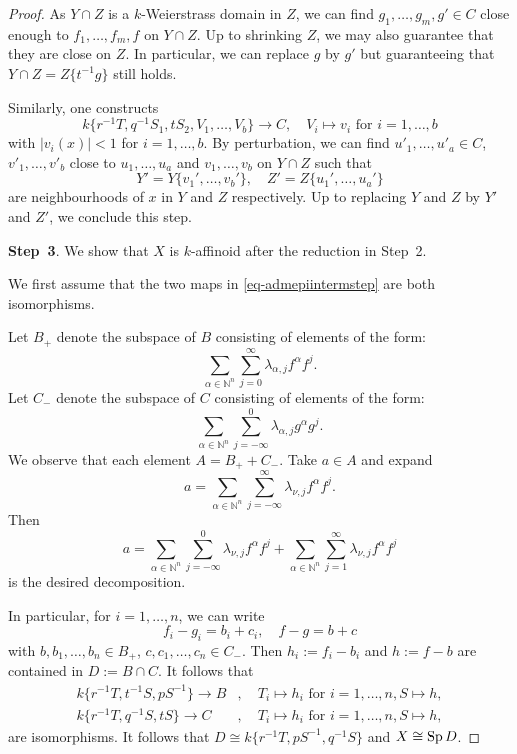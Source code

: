 \begin{proof}
    As $Y\cap Z$ is a $k$-Weierstrass domain in $Z$, we can find $g_1,\ldots,g_m,g'\in C$ close enough to $f_1,\ldots,f_m,f$ on $Y\cap Z$. Up to shrinking $Z$, we may also guarantee that they are close on $Z$. In particular, we can replace $g$ by $g'$ but guaranteeing that $Y\cap Z=Z\{t^{-1}g\}$ still holds.

    Similarly, one constructs 
    \[
        k\{r^{-1}T,q^{-1}S_1,tS_2,V_1,\ldots,V_b\}\rightarrow C,\quad V_i\mapsto v_i\text{ for }i=1,\ldots,b  
    \]
    with $|v_i(x)|<1$ for $i=1,\ldots,b$.
    By perturbation, we can find $u'_1,\ldots,u'_a\in C$, $v'_1,\ldots,v'_b$ close to $u_1,\ldots,u_a$ and $v_1,\ldots,v_b$ on $Y\cap Z$ such that 
    \[
        Y'=Y\{v_1',\ldots,v_b'\},\quad Z'=Z\{u_1',\ldots,u_a'\}  
    \]
    are neighbourhoods of $x$ in $Y$ and $Z$ respectively. Up to replacing $Y$ and $Z$ by $Y'$ and $Z'$, we conclude this step.
    
    \textbf{Step~3}. We show that $X$ is $k$-affinoid after the reduction in Step~2.

    We first assume that the two maps in \eqref{eq-admepiintermstep} are both isomorphisms.
    
    Let $B_+$ denote the subspace of $B$ consisting of elements of the form:
    \[
        \sum_{\alpha\in \mathbb{N}^n}\sum_{j=0}^{\infty} \lambda_{\alpha,j}f^{\alpha} f^j.  
    \]
    Let $C_-$ denote the subspace of $C$ consisting of elements of the form:
    \[
        \sum_{\alpha\in \mathbb{N}^n}\sum_{j=-\infty}^{0} \lambda_{\alpha,j}g^{\alpha} g^j.  
    \]
    We observe that each element $A=B_++C_-$. Take $a\in A$ and expand
    \[
        a=\sum_{\alpha\in \mathbb{N}^n}\sum_{j=-\infty}^{\infty} \lambda_{\nu,j}f^{\alpha}f^j.  
    \]
    Then 
    \[
        a=  \sum_{\alpha\in \mathbb{N}^n}\sum_{j=-\infty}^{0} \lambda_{\nu,j}f^{\alpha}f^j+\sum_{\alpha\in \mathbb{N}^n}\sum_{j=1}^{\infty} \lambda_{\nu,j}f^{\alpha}f^j  
    \]
    is the desired decomposition.

    In particular, for $i=1,\ldots,n$, we can write
    \[
        f_i-g_i=b_i+c_i,\quad f-g=b+c  
    \]
    with $b,b_1,\ldots,b_n\in B_+$, $c,c_1,\ldots,c_n\in C_-$. Then $h_i:=f_i-b_i$ and $h:=f-b$ are contained in $D:=B\cap C$. It follows that 
    \[
        \begin{aligned}
        k\{r^{-1}T,t^{-1}S,pS^{-1}\}\rightarrow B &,\quad T_i\mapsto h_i \text{ for } i=1,\ldots,n,S\mapsto h,\\
        k\{r^{-1}T,q^{-1}S,tS\}\rightarrow C &,\quad T_i\mapsto h_i \text{ for } i=1,\ldots,n,S\mapsto h,
        \end{aligned}
    \]
    are isomorphisms. It follows that $D\cong k\{r^{-1}T,pS^{-1},q^{-1}S\}$ and $X\cong \operatorname{Sp} D$.


\end{proof}
